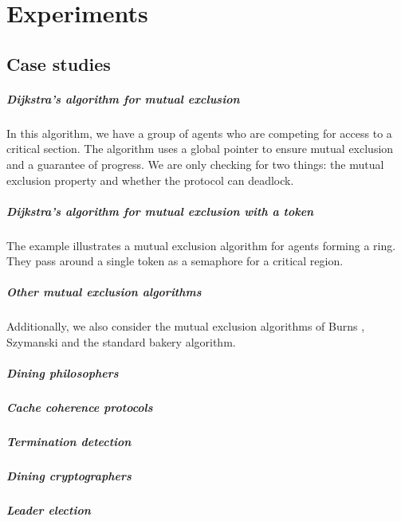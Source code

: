 \chapter{Experiments}\label{chapter:experiment}

\section{Case studies}
\paragraph{Dijkstra’s algorithm for mutual exclusion}
In this algorithm, we have a group of agents who are competing for access to a critical section.
The algorithm uses a global pointer to ensure mutual exclusion and a guarantee of progress. 
We are only checking for two things: the mutual exclusion property and whether the protocol can deadlock.
\paragraph{Dijkstra’s algorithm for mutual exclusion with a token}
The example illustrates a mutual exclusion algorithm for agents forming a ring. 
They pass around a single token as a semaphore for a critical region.
\paragraph{Other mutual exclusion algorithms}
Additionally, we also consider the mutual exclusion algorithms of Burns
, Szymanski and the standard bakery algorithm.
\paragraph{Dining philosophers}
\paragraph{Cache coherence protocols}
\paragraph{Termination detection}
\paragraph{Dining cryptographers}
\paragraph{Leader election}
